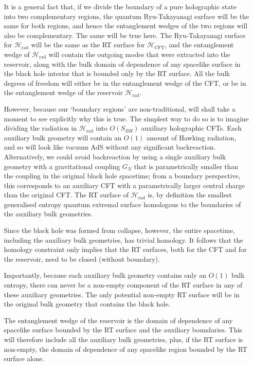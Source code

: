 \documentclass[11pt,a4paper]{article}
\begin{document}
It is a general fact that, if we divide the boundary of a pure holographic state into two complementary regions, the quantum Ryu-Takayanagi surface will be the same for both regions, and hence the entanglement wedges of the two regions will also be complementary. The same will be true here. The Ryu-Takayanagi surface for $\mathcal{H}_\text{rad}$ will be the same as the RT surface for $\mathcal{H}_\text{CFT}$, and the entanglement wedge of $\mathcal{H}_\text{rad}$ will contain the outgoing modes that were extracted into the reservoir, along with the bulk domain of dependence of any spacelike surface in the black hole interior that is bounded only by the RT surface. All the bulk degrees of freedom will either be in the entanglement wedge of the CFT, or be in the entanglement wedge of the reservoir $\mathcal{H}_\text{rad}$.

However, because our `boundary regions' are non-traditional, will shall take a moment to see explicitly why this is true. The simplest way to do so is to imagine dividing the radiation in $\mathcal{H}_\text{rad}$ into $O(S_{BH})$ auxiliary holographic CFTs. Each auxiliary bulk geometry will contain an $O(1)$ amount of Hawking radiation, and so will look like vacuum AdS without any significant backreaction. Alternatively, we could avoid backreaction by using a single auxiliary bulk geometry with a gravitational coupling $G_N$ that is parametrically smaller than the coupling in the original black hole spacetime; from a boundary perspective, this corresponds to an auxiliary CFT with a parametrically larger central charge than the original CFT. The RT surface of $\mathcal{H}_\text{rad}$ is, by definition the smallest generalised entropy quantum extremal surface homologous to the boundaries of the auxiliary bulk geometries.

Since the black hole was formed from collapse, however, the entire spacetime, including the auxiliary bulk geometries, has trivial homology. It follows that the homology constraint only implies that the RT surfaces, both for the CFT and for the reservoir, need to be closed (without boundary).

Importantly, because each auxiliary bulk geometry contains only an $O(1)$ bulk entropy, there can never be a non-empty component of the RT surface in any of these auxiliary geometries. The only potential non-empty RT surface will be in the original bulk geometry that contains the black hole. 

The entanglement wedge of the reservoir is the domain of dependence of any spacelike surface bounded by the RT surface and the auxiliary boundaries. This will therefore include all the auxiliary bulk geometries, plus, if the RT surface is non-empty, the domain of dependence of any spacelike region bounded by the RT surface alone.
\end{document}
